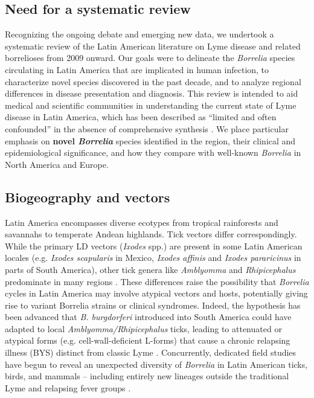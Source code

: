 \documentclass[11pt,letterpaper]{article}
\begin{document}
\subsection{Need for a systematic review}
Recognizing the ongoing debate and emerging new data, we undertook a systematic review of the Latin American literature on Lyme disease and related borrelioses from 2009 onward. Our goals were to delineate the \textit{Borrelia} species circulating in Latin America that are implicated in human infection, to characterize novel species discovered in the past decade, and to analyze regional differences in disease presentation and diagnosis. This review is intended to aid medical and scientific communities in understanding the current state of Lyme disease in Latin America, which has been described as “limited and often confounded” in the absence of comprehensive synthesis \citep{Lucca2024b}. We place particular emphasis on \textbf{novel \textit{Borrelia}} species identified in the region, their clinical and epidemiological significance, and how they compare with well-known \textit{Borrelia} in North America and Europe.

\subsection{Biogeography and vectors}
Latin America encompasses diverse ecotypes from tropical rainforests and savannahs to temperate Andean highlands. Tick vectors differ correspondingly. While the primary LD vectors (\textit{Ixodes} spp.) are present in some Latin American locales (e.g. \textit{Ixodes scapularis} in Mexico, \textit{Ixodes affinis} and \textit{Ixodes pararicinus} in parts of South America), other tick genera like \textit{Amblyomma} and \textit{Rhipicephalus} predominate in many regions \citep{Lucca2024c, Yoshinari2022d}. These differences raise the possibility that \textit{Borrelia} cycles in Latin America may involve atypical vectors and hosts, potentially giving rise to variant Borrelia strains or clinical syndromes. Indeed, the hypothesis has been advanced that \textit{B. burgdorferi} introduced into South America could have adapted to local \textit{Amblyomma/Rhipicephalus} ticks, leading to attenuated or atypical forms (e.g. cell-wall-deficient L-forms) that cause a chronic relapsing illness (BYS) distinct from classic Lyme \citep{Yoshinari2022e, Yoshinari2022f}. Concurrently, dedicated field studies have begun to reveal an unexpected diversity of \textit{Borrelia} in Latin American ticks, birds, and mammals – including entirely new lineages outside the traditional Lyme and relapsing fever groups \citep{Binetruy2020a, Lucca2024d}.
\end{document}
